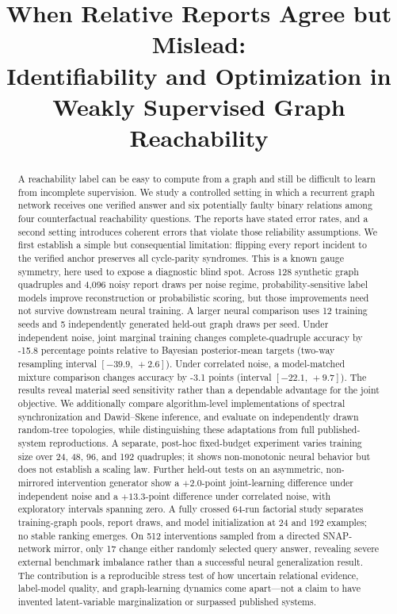 \documentclass[10pt]{article}
\title{When Relative Reports Agree but Mislead:\\
Identifiability and Optimization in Weakly Supervised Graph Reachability}
\author{}
\begin{document}
\maketitle
\begin{abstract}
A reachability label can be easy to compute from a graph and still be difficult to learn from incomplete supervision. We study a controlled setting in which a recurrent graph network receives one verified answer and six potentially faulty binary relations among four counterfactual reachability questions. The reports have stated error rates, and a second setting introduces coherent errors that violate those reliability assumptions. We first establish a simple but consequential limitation: flipping every report incident to the verified anchor preserves all cycle-parity syndromes. This is a known gauge symmetry, here used to expose a diagnostic blind spot. Across 128 synthetic graph quadruples and 4,096 noisy report draws per noise regime, probability-sensitive label models improve reconstruction or probabilistic scoring, but those improvements need not survive downstream neural training. A larger neural comparison uses 12 training seeds and 5 independently generated held-out graph draws per seed. Under independent noise, joint marginal training changes complete-quadruple accuracy by -15.8 percentage points relative to Bayesian posterior-mean targets (two-way resampling interval $[-39.9,\,+2.6]$). Under correlated noise, a model-matched mixture comparison changes accuracy by -3.1 points (interval $[-22.1,\,+9.7]$). The results reveal material seed sensitivity rather than a dependable advantage for the joint objective. We additionally compare algorithm-level implementations of spectral synchronization and Dawid--Skene inference, and evaluate on independently drawn random-tree topologies, while distinguishing these adaptations from full published-system reproductions. A separate, post-hoc fixed-budget experiment varies training size over 24, 48, 96, and 192 quadruples; it shows non-monotonic neural behavior but does not establish a scaling law. Further held-out tests on an asymmetric, non-mirrored intervention generator show a $+2.0$-point joint-learning difference under independent noise and a $+13.3$-point difference under correlated noise, with exploratory intervals spanning zero. A fully crossed 64-run factorial study separates training-graph pools, report draws, and model initialization at 24 and 192 examples; no stable ranking emerges. On 512 interventions sampled from a directed SNAP-network mirror, only 17 change either randomly selected query answer, revealing severe external benchmark imbalance rather than a successful neural generalization result. The contribution is a reproducible stress test of how uncertain relational evidence, label-model quality, and graph-learning dynamics come apart---not a claim to have invented latent-variable marginalization or surpassed published systems.
\end{abstract}
\end{document}

